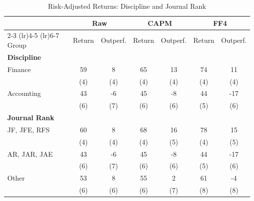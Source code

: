 \begin{table}[htbp]
\centering
\small
\caption{Risk-Adjusted Returns: Discipline and Journal Rank}
\label{tab:risk_adjusted_tv_dj}
\begin{tabular}{lcccccc}
\toprule
  & \multicolumn{2}{c}{Raw} & \multicolumn{2}{c}{CAPM} & \multicolumn{2}{c}{FF4}
\\
\cmidrule(lr){2-3} \cmidrule(lr){4-5} \cmidrule(lr){6-7}
Group & Return & Outperf. & Return & Outperf. & Return & Outperf.
\\
\midrule
\multicolumn{7}{l}{\textbf{Discipline}}\\
\addlinespace[2pt]
Finance & 59 & 8 & 65 & 13 & 74 & 11
\\
 & (4) & (4) & (4) & (4) & (4) & (4)
\\[2pt]
Accounting & 43 & -6 & 45 & -8 & 44 & -17
\\
 & (6) & (7) & (6) & (6) & (5) & (6)
\\[2pt]
\multicolumn{7}{l}{\textbf{Journal Rank}}\\
\addlinespace[2pt]
JF, JFE, RFS & 60 & 8 & 68 & 16 & 78 & 15
\\
 & (4) & (4) & (4) & (5) & (4) & (5)
\\[2pt]
AR, JAR, JAE & 43 & -6 & 45 & -8 & 44 & -17
\\
 & (6) & (7) & (6) & (6) & (5) & (6)
\\[2pt]
Other & 53 & 8 & 55 & 2 & 61 & -4
\\
 & (6) & (6) & (6) & (7) & (8) & (8)
\\[2pt]
\bottomrule
\end{tabular}
\end{table}
